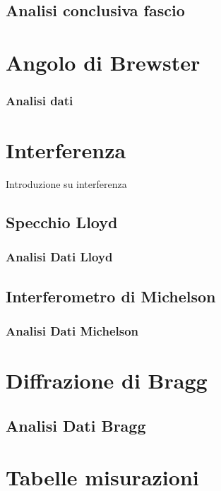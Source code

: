 \documentclass[letterpaper,12pt]{article}
\begin{document}
\subsection{Analisi conclusiva fascio}


\section{Angolo di Brewster}

\subsubsection{Analisi dati} 

\section{Interferenza}
Introduzione su interferenza 

\subsection{Specchio Lloyd}

\subsubsection{Analisi Dati Lloyd}

\subsection{Interferometro di Michelson}


\subsubsection{Analisi Dati Michelson}


\section{Diffrazione di Bragg}

\subsection{Analisi Dati Bragg}

\newpage
\section{Tabelle misurazioni}
\end{document}

